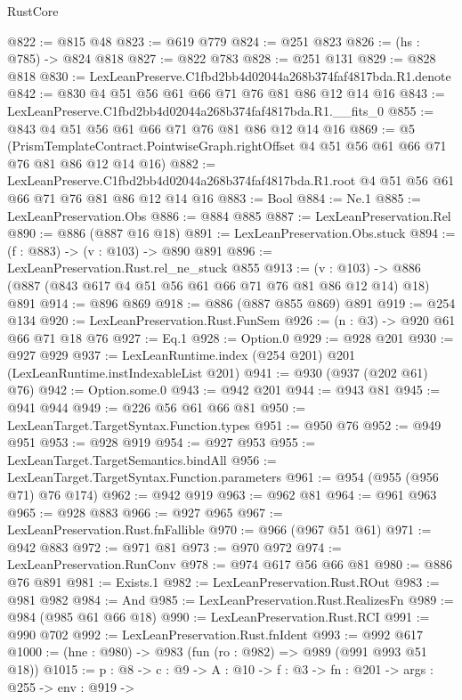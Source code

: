 \begin{lexlean}{RustCore}
\begin{coremodule}
@822 := @815 @48
@823 := @619 @779
@824 := @251 @823
@826 := (hs : @785) -> @824 @818
@827 := @822 @783
@828 := @251 @131
@829 := @828 @818
@830 := LexLeanPreserve.C1fbd2bb4d02044a268b374faf4817bda.R1.denote
@842 := @830 @4 @51 @56 @61 @66 @71 @76 @81 @86 @12 @14 @16
@843 := LexLeanPreserve.C1fbd2bb4d02044a268b374faf4817bda.R1.__fits_0
@855 := @843 @4 @51 @56 @61 @66 @71 @76 @81 @86 @12 @14 @16
@869 := @5
    (PrismTemplateContract.PointwiseGraph.rightOffset
      @4
      @51
      @56
      @61
      @66
      @71
      @76
      @81
      @86
      @12
      @14
      @16)
@882 := LexLeanPreserve.C1fbd2bb4d02044a268b374faf4817bda.R1.root
    @4
    @51
    @56
    @61
    @66
    @71
    @76
    @81
    @86
    @12
    @14
    @16
@883 := Bool
@884 := Ne.{1}
@885 := LexLeanPreservation.Obs
@886 := @884 @885
@887 := LexLeanPreservation.Rel
@890 := @886 (@887 @16 @18)
@891 := LexLeanPreservation.Obs.stuck
@894 := (f : @883) -> (v : @103) -> @890 @891
@896 := LexLeanPreservation.Rust.rel_ne_stuck @855
@913 := (v : @103) -> @886 (@887 (@843 @617 @4 @51 @56 @61 @66 @71 @76 @81 @86 @12 @14) @18) @891
@914 := @896 @869
@918 := @886 (@887 @855 @869) @891
@919 := @254 @134
@920 := LexLeanPreservation.Rust.FunSem
@926 := (n : @3) -> @920 @61 @66 @71 @18 @76
@927 := Eq.{1}
@928 := Option.{0}
@929 := @928 @201
@930 := @927 @929
@937 := LexLeanRuntime.index (@254 @201) @201 (LexLeanRuntime.instIndexableList @201)
@941 := @930 (@937 (@202 @61) @76)
@942 := Option.some.{0}
@943 := @942 @201
@944 := @943 @81
@945 := @941 @944
@949 := @226 @56 @61 @66 @81
@950 := LexLeanTarget.TargetSyntax.Function.types
@951 := @950 @76
@952 := @949 @951
@953 := @928 @919
@954 := @927 @953
@955 := LexLeanTarget.TargetSemantics.bindAll
@956 := LexLeanTarget.TargetSyntax.Function.parameters
@961 := @954 (@955 (@956 @71) @76 @174)
@962 := @942 @919
@963 := @962 @81
@964 := @961 @963
@965 := @928 @883
@966 := @927 @965
@967 := LexLeanPreservation.Rust.fnFallible
@970 := @966 (@967 @51 @61)
@971 := @942 @883
@972 := @971 @81
@973 := @970 @972
@974 := LexLeanPreservation.RunConv
@978 := @974 @617 @56 @66 @81
@980 := @886 @76 @891
@981 := Exists.{1}
@982 := LexLeanPreservation.Rust.ROut
@983 := @981 @982
@984 := And
@985 := LexLeanPreservation.Rust.RealizesFn
@989 := @984 (@985 @61 @66 @18)
@990 := LexLeanPreservation.Rust.RCI
@991 := @990 @702
@992 := LexLeanPreservation.Rust.fnIdent
@993 := @992 @617
@1000 := (hne : @980) -> @983 (fun (ro : @982) => @989 (@991 @993 @51 @18))
@1015 := {p : @8} ->
  {c : @9} ->
  {A : @10} ->
  {f : @3} ->
  {fn : @201} ->
  {args : @255} ->
  {env : @919} ->

\end{coremodule}
\end{lexlean}
